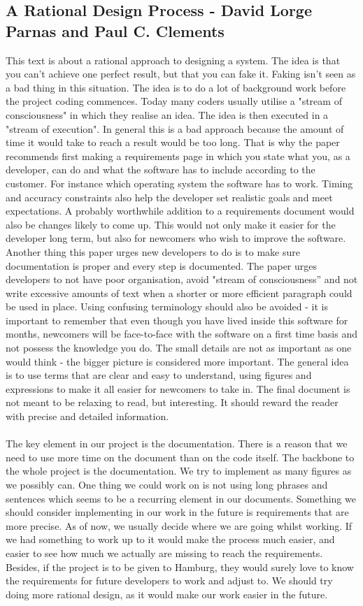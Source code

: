 \documentclass[12pt,a4paper]{article}
\begin{document}
\subsection{A Rational Design Process - David Lorge Parnas and Paul C. Clements}
This text is about a rational approach to designing a system. The idea is that you can't achieve one perfect result, but that you can fake it. Faking isn't seen as a bad thing in this situation. The idea is to do a lot of background work before the project coding commences. Today many coders usually utilise a "stream of consciousness" in which they realise an idea. The idea is then executed in a "stream of execution". In general this is a bad approach because the amount of time it would take to reach a result would be too long. That is why the paper recommends first making a requirements page in which you state what you, as a developer, can do and what the software has to include according to the customer. For instance which operating system the software has to work. Timing and accuracy constraints also help the developer set realistic goals and meet expectations. A probably worthwhile addition to a requirements document would also be changes likely to come up. This would not only make it easier for the developer long term, but also for newcomers who wish to improve the software. Another thing this paper urges new developers to do is to make sure documentation is proper and every step is documented. The paper urges developers to not have poor organisation, avoid "stream of consciousness” and not write excessive amounts of text when a shorter or more efficient paragraph could be used in place. Using confusing terminology should also be avoided - it is important to remember that even though you have lived inside this software for months, newcomers will be face-to-face with the software on a first time basis and not possess the knowledge you do. The small details are not as important as one would think - the bigger picture is considered more important.
The general idea is to use terms that are clear and easy to understand, using figures and expressions to make it all easier for newcomers to take in. The final document is not meant to be relaxing to read, but interesting. It should reward the reader with precise and detailed information.
\\
\\
The key element in our project is the documentation. There is a reason that we need to use more time on the document than on the code itself. The backbone to the whole project is the documentation. We try to implement as many figures as we possibly can. One thing we could work on is not using long phrases and sentences which seems to be a recurring element in our documents. Something we should consider implementing in our work in the future is requirements that are more precise. As of now, we usually decide where we are going whilst working. If we had something to work up to it would make the process much easier, and easier to see how much we actually are missing to reach the requirements. Besides, if the project is to be given to Hamburg, they would surely love to know the requirements for future developers to work and adjust to. We should try doing more rational design, as it would make our work easier in the future.
\newpage
\end{document}
